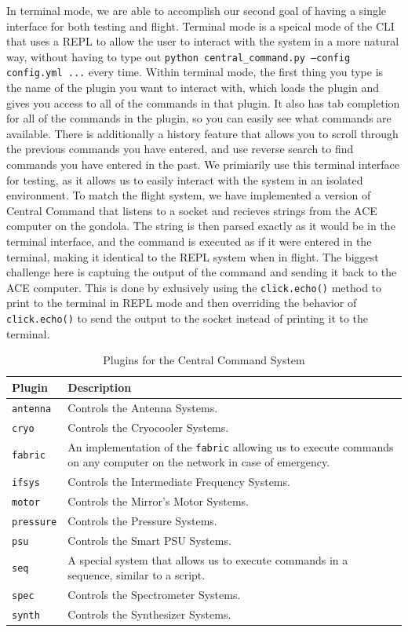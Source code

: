 In terminal mode, we are able to accomplish our second goal of having a single interface for both testing and flight.
Terminal mode is a speical mode of the CLI that uses a REPL to allow the user to interact with the system in a more natural way, without having to type out \texttt{python central\_command.py --config config.yml ...} every time.
Within terminal mode, the first thing you type is the name of the plugin you want to interact with, which loads the plugin and gives you access to all of the commands in that plugin.
It also has tab completion for all of the commands in the plugin, so you can easily see what commands are available.
There is additionally a history feature that allows you to scroll through the previous commands you have entered, and use reverse search to find commands you have entered in the past.
We primiarily use this terminal interface for testing, as it allows us to easily interact with the system in an isolated environment.
To match the flight system, we have implemented a version of Central Command that listens to a socket and recieves strings from the ACE computer on the gondola. 
The string is then parsed exactly as it would be in the terminal interface, and the command is executed as if it were entered in the terminal, making it identical to the REPL system when in flight. 
The biggest challenge here is captuing the output of the command and sending it back to the ACE computer.
This is done by exlusively using the \texttt{click.echo()} method to print to the terminal in REPL mode and then overriding the behavior of \texttt{click.echo()} to send the output to the socket instead of printing it to the terminal.

\begin{table}
    \centering
    \begin{tabularx}{\textwidth}{l|X}
        \textbf{Plugin} & \textbf{Description} \\
        \hline
        \texttt{antenna} & Controls the Antenna Systems. \\
        \texttt{cryo} & Controls the Cryocooler Systems. \\
        \texttt{fabric} & An implementation of the \texttt{fabric} allowing us to execute commands on any computer on the network in case of emergency. \\
        \texttt{ifsys} & Controls the Intermediate Frequency Systems. \\
        \texttt{motor} & Controls the Mirror's Motor Systems. \\
        \texttt{pressure} & Controls the Pressure Systems. \\
        \texttt{psu} & Controls the Smart PSU Systems. \\
        \texttt{seq} & A special system that allows us to execute commands in a sequence, similar to a script. \\
        \texttt{spec} & Controls the Spectrometer Systems. \\
        \texttt{synth} & Controls the Synthesizer Systems. \\
    \end{tabularx}
    \label{chap2/table:click_plugins}
    \caption{Plugins for the Central Command System}
\end{table}

